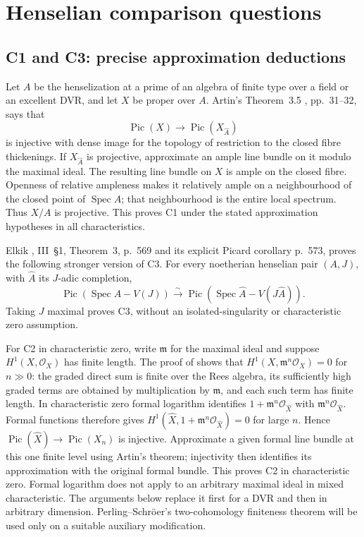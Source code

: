 \section{Henselian comparison questions}
\subsection{C1 and C3: precise approximation deductions}

Let $A$ be the henselization at a prime of an algebra of finite type over a
field or an excellent DVR, and let $X$ be proper over $A$.
Artin's Theorem~3.5 \cite{Artin1969}, pp.~31--32, says that
\[
 \operatorname{Pic}(X)\longrightarrow\operatorname{Pic}(X_{\widehat A})
\]
is injective with dense image for the topology of restriction to the closed
fibre thickenings. If $X_{\widehat A}$ is projective, approximate an ample
line bundle on it modulo the maximal ideal. The resulting line bundle on
$X$ is ample on the closed fibre. Openness of relative ampleness makes it
relatively ample on a neighbourhood of the closed point of $\operatorname{Spec}A$;
that neighbourhood is the entire local spectrum. Thus $X/A$ is projective.
This proves C1 under the stated approximation hypotheses in all characteristics.

Elkik \cite{Elkik1973}, III~\S1, Theorem~3, p.~569 and its explicit Picard
corollary p.~573, proves the following stronger version of C3. For every
noetherian henselian pair $(A,J)$, with $\widehat A$ its $J$-adic completion,
\[
 \operatorname{Pic}(\operatorname{Spec}A-V(J))
 \xrightarrow{\sim}
 \operatorname{Pic}(\operatorname{Spec}\widehat A-V(J\widehat A)).
\tag{C.1}
\]
Taking $J$ maximal proves C3, without an isolated-singularity or characteristic
zero assumption.

For C2 in characteristic zero, write $\mathfrak m$ for the maximal ideal and
suppose $H^1(X,\mathcal O_X)$ has finite length. The proof of
\cite[Proposition~1.2]{PerlingSchroer2017} shows that
$H^1(X,\mathfrak m^n\mathcal O_X)=0$ for $n\gg0$: the graded direct sum is
finite over the Rees algebra, its sufficiently high graded terms are obtained
by multiplication by $\mathfrak m$, and each such term has finite length.
In characteristic zero formal logarithm identifies
$1+\mathfrak m^n\mathcal O_{\widehat X}$ with
$\mathfrak m^n\mathcal O_{\widehat X}$. Formal functions therefore gives
$H^1(\widehat X,1+\mathfrak m^n\mathcal O_{\widehat X})=0$ for large $n$.
Hence $\operatorname{Pic}(\widehat X)\to\operatorname{Pic}(X_n)$ is injective.
Approximate a given formal line bundle at this one finite level using Artin's
theorem; injectivity then identifies its approximation with the original
formal bundle. This proves C2 in characteristic zero.
Formal logarithm does not apply to an arbitrary maximal ideal in mixed
characteristic. The arguments below replace it first for a DVR and then
in arbitrary dimension. Perling--Schr\"oer's two-cohomology finiteness
theorem will be used only on a suitable auxiliary modification.

